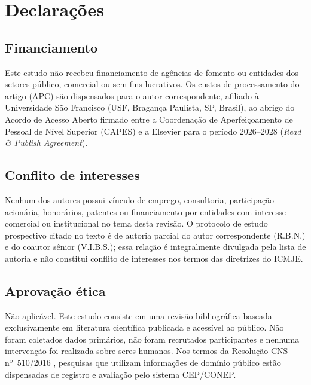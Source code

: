 \documentclass[a4paper,fleqn]{cas-sc}
\begin{document}
\section*{Declarações}

\subsection*{Financiamento}
Este estudo não recebeu financiamento de agências de fomento ou entidades
dos setores público, comercial ou sem fins lucrativos.
Os custos de processamento do artigo (APC) são dispensados para o autor
correspondente, afiliado à Universidade São Francisco (USF, Bragança
Paulista, SP, Brasil), ao abrigo do Acordo de Acesso Aberto firmado entre
a Coordenação de Aperfeiçoamento de Pessoal de Nível Superior (CAPES)
e a Elsevier para o período 2026--2028
(\textit{Read \& Publish Agreement}).

\subsection*{Conflito de interesses}
Nenhum dos autores possui vínculo de emprego, consultoria, participação
acionária, honorários, patentes ou financiamento por entidades com
interesse comercial ou institucional no tema desta revisão.
O protocolo de estudo prospectivo citado no texto
\citep{BaenaNeto2026} é de autoria parcial do autor correspondente
(R.B.N.) e do coautor sênior (V.I.B.S.); essa relação é integralmente
divulgada pela lista de autoria e não constitui conflito de interesses
nos termos das diretrizes do ICMJE\@.

\subsection*{Aprovação ética}
Não aplicável. Este estudo consiste em uma revisão bibliográfica baseada
exclusivamente em literatura científica publicada e acessível ao público.
Não foram coletados dados primários, não foram recrutados participantes e
nenhuma intervenção foi realizada sobre seres humanos.
Nos termos da Resolução CNS nº~510/2016 \citep{CNS510_2016}, pesquisas
que utilizam informações de domínio público estão dispensadas de registro e
avaliação pelo sistema CEP/CONEP\@.
\end{document}
